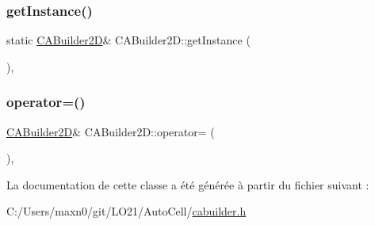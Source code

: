 \mbox{\label{class_c_a_builder2_d_a013a50b0ebd4313516febd015db293c2}} 
\subsubsection{\texorpdfstring{get\+Instance()}{getInstance()}}
{\footnotesize\ttfamily static \mbox{\hyperlink{class_c_a_builder2_d}{C\+A\+Builder2D}}\& C\+A\+Builder2\+D\+::get\+Instance (\begin{DoxyParamCaption}{ }\end{DoxyParamCaption})\hspace{0.3cm}{\ttfamily [inline]}, {\ttfamily [static]}}

\mbox{\label{class_c_a_builder2_d_aa21c22e1d8f10b05bad1b13988adf49d}} 
\subsubsection{\texorpdfstring{operator=()}{operator=()}}
{\footnotesize\ttfamily \mbox{\hyperlink{class_c_a_builder2_d}{C\+A\+Builder2D}}\& C\+A\+Builder2\+D\+::operator= (\begin{DoxyParamCaption}\item[{const \mbox{\hyperlink{class_c_a_builder2_d}{C\+A\+Builder2D}} \&}]{ }\end{DoxyParamCaption})\hspace{0.3cm}{\ttfamily [private]}, {\ttfamily [delete]}}



La documentation de cette classe a été générée à partir du fichier suivant \+:\begin{DoxyCompactItemize}
\item 
C\+:/\+Users/maxn0/git/\+L\+O21/\+Auto\+Cell/\mbox{\hyperlink{cabuilder_8h}{cabuilder.\+h}}\end{DoxyCompactItemize}
